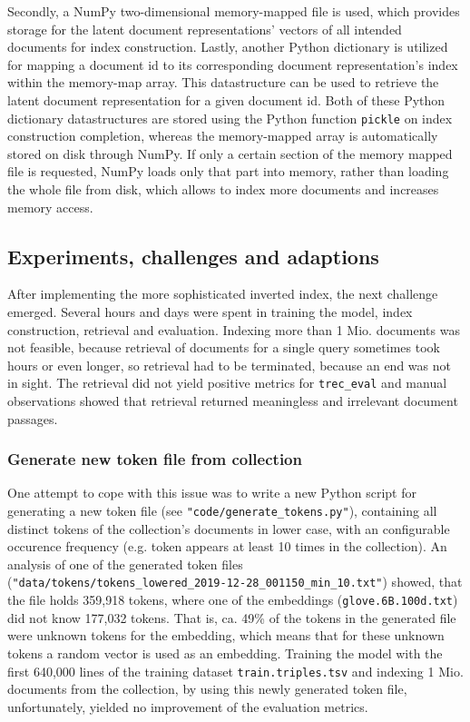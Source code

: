 Secondly, a NumPy two-dimensional memory-mapped file is used, which provides storage for the latent document representations' vectors
    of all intended documents for index construction.
Lastly, another Python dictionary is utilized for mapping a document id to its corresponding document representation's index within 
    the memory-map array.
This datastructure can be used to retrieve the latent document representation for a given document id.
Both of these Python dictionary datastructures are stored using the Python function \texttt{pickle} on index construction completion,
    whereas the memory-mapped array is automatically stored on disk through NumPy.
If only a certain section of the memory mapped file is requested, NumPy loads only that part into memory, rather than loading the 
    whole file from disk, which allows to index more documents and increases memory access.

\subsection{Experiments, challenges and adaptions}
After implementing the more sophisticated inverted index, the next challenge emerged.
Several hours and days were spent in training the model, index construction, retrieval and evaluation.
Indexing more than 1 Mio. documents was not feasible, because retrieval of documents for a single query sometimes took hours or 
    even longer, so retrieval had to be terminated, because an end was not in sight.
The retrieval did not yield positive metrics for \verb|trec_eval| and manual observations showed that retrieval returned meaningless    
    and irrelevant document passages.

\subsubsection*{Generate new token file from collection}
One attempt to cope with this issue was to write a new Python script for generating a 
    new token file (see \texttt{"code/generate\_tokens.py"}), 
    containing all distinct tokens of the collection's documents in lower case, with an configurable occurence frequency 
    (e.g. token appears at least 10 times in the collection).
An analysis of one of the generated token files (\verb|"data/tokens/tokens_lowered_2019-12-28_001150_min_10.txt"|) showed,
    that the file holds 359,918 tokens, where one of the embeddings (\verb|glove.6B.100d.txt|) did not know 177,032 tokens.
That is, ca. 49\% of the tokens in the generated file were unknown tokens for the embedding,
    which means that for these unknown tokens a random vector is used as an embedding.
Training the model with the first 640,000 lines of the training dataset \verb|train.triples.tsv| and
    indexing 1 Mio. documents from the collection,
    by using this newly generated token file, unfortunately, yielded no improvement of the evaluation
    metrics.

